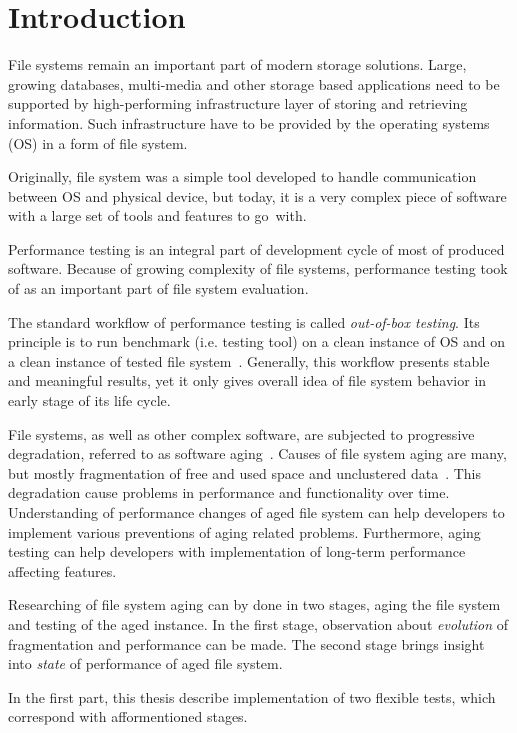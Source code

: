 \documentclass[
  color, %
  table, %
  lof,   %
  lot,   %
]{fithesis3}
\begin{document}
\chapter{Introduction}
File systems remain an important part of modern storage solutions. Large, growing databases, multi-media and other storage based applications need to be supported by high-performing infrastructure layer of storing and retrieving information. Such infrastructure have to be provided by the operating systems (OS) in a form of file system.

Originally, file system was a simple tool developed to handle communication between OS and physical device, but today, it is a very complex piece of software with a large set of tools and features to go~with.

Performance testing is an integral part of development cycle of most of produced software. Because of growing complexity of file systems, performance testing took of as an important part of file system evaluation.

The standard workflow of performance testing is called \emph{out-of-box testing}. Its principle is to run benchmark (i.e. testing tool) on a clean instance of OS and on a clean instance of tested file system~\cite{Traeger:2008:NYS:1367829.1367831}. Generally, this workflow presents stable and meaningful results, yet it only gives overall idea of file system behavior in early stage of its life cycle. 

File systems, as well as other complex software, are subjected to progressive degradation, referred to as software aging~\cite{Cotroneo:2014:SSA:2543749.2539117}. Causes of file system aging are many, but mostly fragmentation of free and used space and unclustered data~\cite{Smith:1997:FSA:258623.258689}. This degradation cause problems in performance and functionality over time. Understanding of performance changes of aged file system can help developers to implement various preventions of aging related problems. Furthermore, aging testing can help developers with implementation of long-term performance affecting features.

Researching of file system aging can by done in two stages, aging the file system and testing of the aged instance. In the first stage, observation about \emph{evolution} of fragmentation and performance can be made. The second stage brings insight into \emph{state} of performance of aged file system.

In the first part, this thesis describe implementation of two flexible tests, which correspond with afformentioned stages.
 
\end{document}
